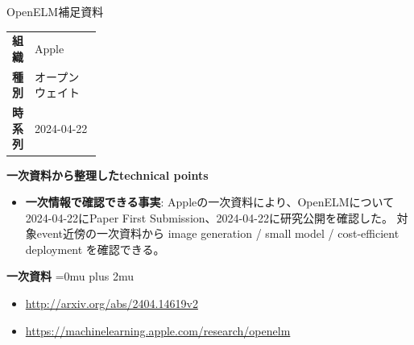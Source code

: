\begin{technicalnote}{OpenELM}{補足資料}
\begingroup
\begin{tabularx}{\linewidth}{@{}>{\bfseries}p{0.22\linewidth}X@{}}
組織 & Apple \\
種別 & オープンウェイト \\
時系列 & 2024-04-22 \\
\end{tabularx}
\smallskip
\begin{minipage}{\linewidth}
{\bfseries 一次資料から整理したtechnical points}
\begin{itemize}[leftmargin=1.5em,itemsep=0.35em]
\item \textbf{一次情報で確認できる事実}: Appleの一次資料により、OpenELMについて2024-04-22にPaper First Submission、2024-04-22に研究公開を確認した。 対象event近傍の一次資料から image generation / small model / cost-efficient deployment を確認できる。
\end{itemize}
\begin{minipage}{\linewidth}
\begin{samepage}
{\bfseries 一次資料}
\begingroup\sloppy
\Urlmuskip=0mu plus 2mu\relax
\begin{itemize}[leftmargin=1.5em,itemsep=0.25em]
\item {\scriptsize\url{http://arxiv.org/abs/2404.14619v2}}
\item {\scriptsize\url{https://machinelearning.apple.com/research/openelm}}
\end{itemize}
\endgroup
\end{samepage}
\end{minipage}
\end{minipage}
\endgroup
\end{technicalnote}
\medskip

